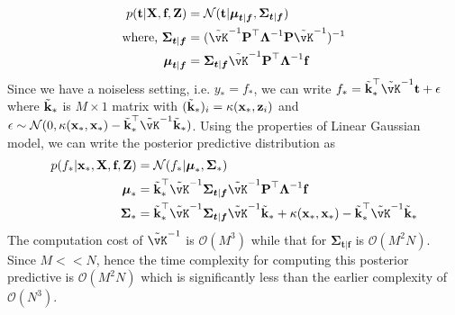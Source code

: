 \documentclass[a4paper,11pt]{article}
\begin{document}
\begin{pmisolution}
\begin{equation*}
\begin{split}
    p(\textbf{t}|\textbf{X}, \textbf{f}, \textbf{Z}) &= \mathcal{N}(\textbf{t}| \boldsymbol{\mu}_{\boldsymbol{t}|\boldsymbol{f}}, \boldsymbol{\Sigma}_{\boldsymbol{t}|\boldsymbol{f}}) \\
    \text{where, } \boldsymbol{\Sigma}_{\boldsymbol{t}|\boldsymbol{f}}  &= (\Tilde{\vK}^{-1}\textbf{P}^\top\boldsymbol{\Lambda}^{-1}\textbf{P}\Tilde{\vK}^{-1})^{-1}  \\
    \boldsymbol{\mu}_{\boldsymbol{t}|\boldsymbol{f}} &= \boldsymbol{\Sigma}_{\boldsymbol{t}|\boldsymbol{f}}\Tilde{\vK}^{-1}\textbf{P}^\top\boldsymbol{\Lambda}^{-1}\textbf{f}
\end{split}
\end{equation*}
Since we have a noiseless setting, i.e. $y_* = f_*$, we can write $f_* = \Tilde{\textbf{k}}_{*}^\top\Tilde{\vK}^{-1}\textbf{t} + \epsilon$ where $\Tilde{\textbf{k}}_*$ is $M \times 1$ matrix with $(\Tilde{\textbf{k}}_*)_i = \kappa(\textbf{x}_*, \textbf{z}_i)$ and  $\epsilon \sim \mathcal{N}(0, \kappa(\textbf{x}_*, \textbf{x}_*) - \Tilde{\textbf{k}}_*^\top\Tilde{\vK}^{-1}\Tilde{\textbf{k}}_*)$. Using the properties of Linear Gaussian model, we can write the posterior predictive distribution as
\begin{align}
        p(f_* |\textbf{x}_*, \textbf{X}, \textbf{f}, \textbf{Z}) &= \mathcal{N}(f_*| \boldsymbol{\mu}_*, \boldsymbol{\Sigma}_*)
        \nonumber
        \\ \boldsymbol{\mu}_* &= \Tilde{\textbf{k}}_*^\top\Tilde{\vK}^{-1}\boldsymbol{\Sigma}_{\boldsymbol{t}|\boldsymbol{f}}\Tilde{\vK}^{-1}\textbf{P}^\top\boldsymbol{\Lambda}^{-1}\textbf{f}
        \nonumber
        \\ \boldsymbol{\Sigma}_* &= \Tilde{\textbf{k}}_*^\top\Tilde{\vK}^{-1}\boldsymbol{\Sigma}_{\boldsymbol{t}|\boldsymbol{f}}\Tilde{\vK}^{-1}\Tilde{\textbf{k}}_* + \kappa(\textbf{x}_*, \textbf{x}_*) -\Tilde{\textbf{k}}_*^\top\Tilde{\vK}^{-1}\Tilde{\textbf{k}}_*
        \nonumber
\end{align}
The computation cost of $\Tilde{\vK}^{-1}$ is $\mathcal{O}(M^3)$ while that for $\boldsymbol{\Sigma}_{\boldsymbol{t}|\boldsymbol{f}}$ is $\mathcal{O}(M^2N)$. Since $M << N$, hence the time complexity for computing this posterior predictive is $\mathcal{O}(M^2N)$ which is significantly less than the earlier complexity of $\mathcal{O}(N^3)$.
\newpage


\end{pmisolution}
\end{document}
